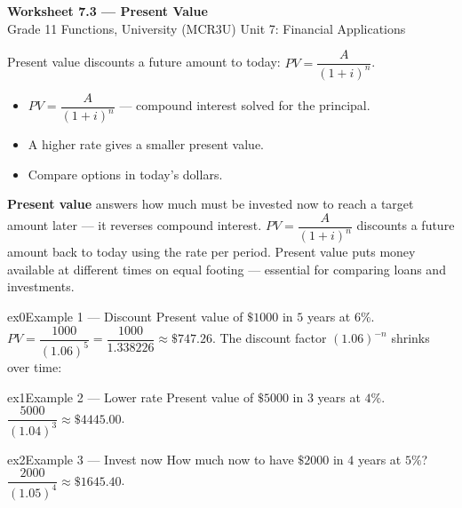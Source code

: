 \documentclass[11pt]{article}
\begin{document}
\begin{center}
{\LARGE\bfseries\color{titleblue}Worksheet 7.3 --- Present Value}\\[2pt]
{\small Grade 11 Functions, University (MCR3U) \textperiodcentered{} Unit 7: Financial Applications}
\end{center}

\begin{ideabox}
Present value discounts a future amount to today: $PV=\dfrac{A}{(1+i)^{n}}$.
\begin{itemize}[leftmargin=*,itemsep=2pt]
  \item $PV=\dfrac{A}{(1+i)^{n}}$ — compound interest solved for the principal.
  \item A higher rate gives a smaller present value.
  \item Compare options in today's dollars.
\end{itemize}
\end{ideabox}

\begin{learnbox}
\textbf{Present value} answers how much must be invested now to reach a target amount later — it reverses compound interest.
$PV=\dfrac{A}{(1+i)^n}$ discounts a future amount back to today using the rate per period.
Present value puts money available at different times on equal footing — essential for comparing loans and investments.
\end{learnbox}


\begin{example}{ex0}{Example 1 --- Discount}
Present value of $\$1000$ in $5$ years at $6\%$.\soln $PV=\dfrac{1000}{(1.06)^{5}}=\dfrac{1000}{1.338226}\approx\$747.26$. The discount factor $(1.06)^{-n}$ shrinks over time:
\end{example}

\begin{example}{ex1}{Example 2 --- Lower rate}
Present value of $\$5000$ in $3$ years at $4\%$.\soln $\dfrac{5000}{(1.04)^{3}}\approx\$4445.00$.
\end{example}

\begin{example}{ex2}{Example 3 --- Invest now}
How much now to have $\$2000$ in $4$ years at $5\%$?\soln $\dfrac{2000}{(1.05)^{4}}\approx\$1645.40$.
\end{example}
\end{document}
